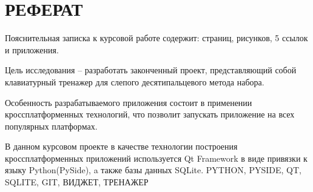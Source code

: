 \thispagestyle{empty}
\setcounter{page}{3}
\section*{\centering РЕФЕРАТ}

\vspace{0.6cm}
Пояснительная записка к курсовой работе содержит: \totalpages{} страниц,
\totalfigures{} рисунков, 5 ссылок и \totalsections{} приложения.

Цель исследования -- разработать законченный проект, представляющий собой
клавиатурный тренажер для слепого десятипальцевого метода набора.

Особенность разрабатываемого приложения состоит в применении кроссплатформенных
технологий, что позволит запускать приложение на всех популярных платформах.


В данном курсовом проекте в качестве технологии построения кроссплатформенных
приложений используется Qt Framework в виде привязки к языку Python(PySide),
a также базы данных SQLite.
\newline
\newline
PYTHON, PYSIDE, QT, SQLITE, GIT, ВИДЖЕТ, ТРЕНАЖЕР 
